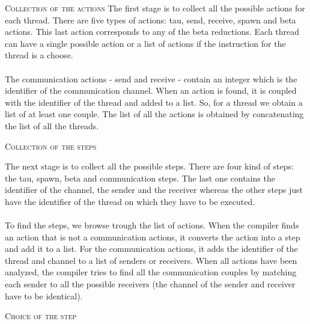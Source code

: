 \documentclass[11pt]{report}
\begin{document}
\newpage

{}
\tabto{1cm} {\Large \textsc{Collection of the actions}}
\vspace*{10pt}
\tabto{1cm}The first stage is to collect all the possible actions for each thread. There are five types of actions: tau, send, receive, spawn and beta actions. This last action corresponds to any of the beta reductions. Each thread can have a single possible action or a list of actions if the instruction for the thread is a choose.
\\ \\
\tabto{1cm}The communication actions - send and receive - contain an integer which is the identifier of the communication channel. When an action is found, it is coupled with the identifier of the thread and added to a list. So, for a thread we obtain a list of at least one couple. The list of all the actions is obtained by concatenating the list of all the threads.

\vspace*{10pt}
\vspace*{10pt}
{}
\tabto{1cm} {\Large \textsc{Collection of the steps}}
\vspace*{10pt}

\tabto{1cm}The next stage is to collect all the possible steps. There are four kind of steps: the tau, spawn, beta and communication steps. The last one contains the identifier of the channel, the sender and the receiver whereas the other steps just have the identifier of the thread on which they have to be executed. 
\\ \\
\tabto{1cm}To find the steps, we browse trough the list of actions. When the compiler finds an action that is not a communication actions, it converts the action into a step and add it to a list. For the communication actions, it adds the identifier of the thread and channel to a list of senders or receivers. When all actions have been analyzed, the compiler tries to find all the communication couples by matching each sender to all the possible receivers (the channel of the sender and receiver have to be identical).

\vspace*{10pt}
\vspace*{10pt}
{}
\tabto{1cm} {\Large \textsc{Choice of the step}}
\vspace*{10pt}
\end{document}
